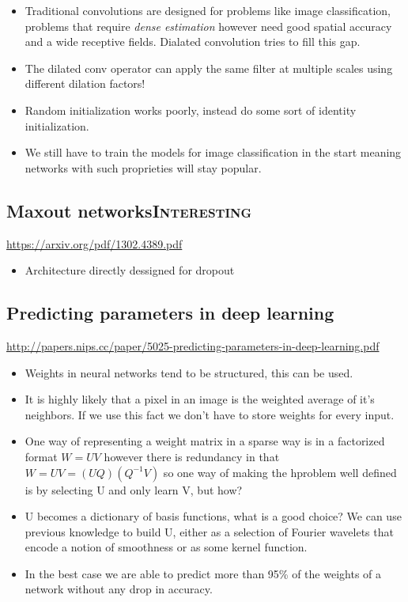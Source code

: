 \documentclass[11pt]{article}
\begin{document}
\begin{itemize}
\item Traditional convolutions are designed for problems like image classification, problems that require \emph{dense estimation} however need good spatial accuracy and a wide receptive fields. Dialated convolution tries to fill this gap.
\item The dilated conv operator can apply the same filter at multiple scales using different dilation factors!
\item Random initialization works poorly, instead do some sort of identity initialization.
\item We still have to train the models for image classification in the start meaning networks with such proprieties will stay popular.
\end{itemize}

\subsection{Maxout networks\hfill{}\textsc{Interesting}}
\label{sec:orgfcfad91}
\url{https://arxiv.org/pdf/1302.4389.pdf}

\begin{itemize}
\item Architecture directly dessigned for dropout
\end{itemize}
\subsection{Predicting parameters in deep learning}
\label{sec:org32da8aa}
\url{http://papers.nips.cc/paper/5025-predicting-parameters-in-deep-learning.pdf}

\begin{itemize}
\item Weights in neural networks tend to be structured, this can be used.
\item It is highly likely that a pixel in an image is the weighted average of it's neighbors. If we use this fact we don't have to store weights for every input.
\item One way of representing a weight matrix in a sparse way is in a factorized format \(W = UV\) however there is redundancy in that \(W = UV = (UQ)(Q^{-1}V)\) so one way of making the hproblem well defined is by selecting U and only learn V, but how?
\item U becomes a dictionary of basis functions, what is a good choice? We can use previous knowledge to build U, either as a selection of Fourier wavelets that encode a notion of smoothness or as some kernel function.
\item In the best case we are able to predict more than 95\% of the weights of a network without any drop in accuracy.
\end{itemize}
\end{document}
